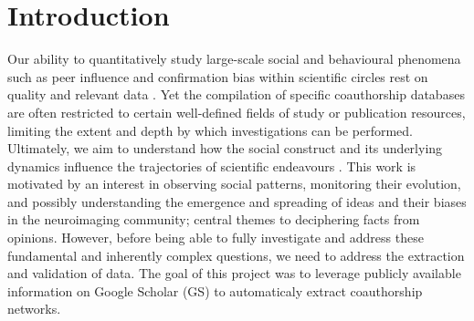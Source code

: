 \documentclass[twocolumn]{bmcart}%
\begin{document}
\begin{frontmatter}
\begin{fmbox}

	








%
\end{fmbox}%

\end{frontmatter}


\section{Introduction}\label{introduction}

Our ability to quantitatively study large-scale social and behavioural
phenomena such as peer influence and confirmation bias within scientific
circles rest on quality and relevant data
\cite{BiologicalNetworks:Freeman2004}. Yet the compilation of specific
coauthorship databases are often restricted to certain well-defined
fields of study or publication resources, limiting the extent and depth
by which investigations can be performed. Ultimately, we aim to
understand how the social construct and its underlying dynamics
influence the trajectories of scientific endeavours
\cite{Sarigol2014:PredictingSuccess}. This work is motivated by an
interest in observing social patterns, monitoring their evolution, and
possibly understanding the emergence and spreading of ideas and their
biases in the neuroimaging community; central themes to deciphering
facts from opinions. However, before being able to fully investigate and
address these fundamental and inherently complex questions, we need to
address the extraction and validation of data. The goal of this project
was to leverage publicly available information on Google Scholar (GS) to
automaticaly extract coauthorship networks.
\end{document}
